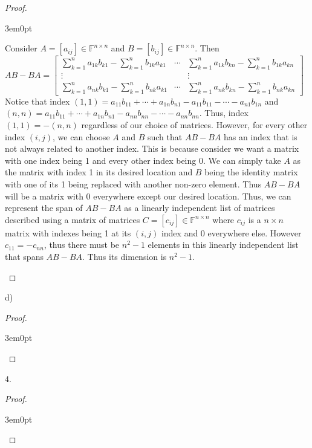 \documentclass[11pt]{article}
\newcommand{\F}{\mathbb{F}}
\newenvironment{myproof}
{\begin{proof} \begin{adjustwidth}{3em}{0pt}$ $\par\nobreak\ignorespaces}
{\end{adjustwidth} \end{proof}}
\begin{document}
\begin{flushleft}
\begin{myproof}
Consider $A = [a_{ij}] \in \F^{n \times n}$ and $B = [b_{ij}] \in \F^{n \times n}$. Then $AB - BA = \begin{bmatrix}
\sum_{k = 1}^n a_{1k}b_{k1} - \sum_{k = 1}^n b_{1k}a_{k1} & \cdots & \sum_{k = 1}^n a_{1k}b_{kn} - \sum_{k = 1}^n b_{1k}a_{kn} \\
\vdots & & \vdots \\
\sum_{k = 1}^n a_{nk}b_{k1} - \sum_{k = 1}^n b_{nk}a_{k1} & \cdots & \sum_{k = 1}^n a_{nk}b_{kn} - \sum_{k = 1}^n b_{nk}a_{kn}
\end{bmatrix}$ \\
\bigskip
Notice that index $(1,1) = a_{11}b_{11} + \cdots + a_{1n}b_{n1} - a_{11}b_{11} - \cdots - a_{n1}b_{1n}$ and $(n,n) =  a_{11}b_{11} + \cdots + a_{1n}b_{n1} - a_{nn}b_{nn} - \cdots - a_{nn}b_{nn}$. Thus, index $(1,1) = -(n,n)$ regardless of our choice of matrices. However, for every other index $(i,j)$, we can choose $A$ and $B$ such that $AB -BA$ has an index that is not always related to another index. This is because consider we want a matrix with one index being 1 and every other index being 0. We can simply take $A$ as the matrix with index 1 in its desired location and $B$ being the identity matrix with one of its 1 being replaced with another non-zero element. Thus $AB-BA$ will be a matrix with 0 everywhere except our desired location. Thus, we can represent the span of $AB-BA$ as a linearly independent list of matrices described using a matrix of matrices $C = [c_{ij}] \in \F^{n \times n}$ where $c_{ij}$ is a $n \times n$ matrix with indexes being 1 at its $(i,j)$ index and 0 everywhere else. However $c_{11} = -c_{nn}$, thus there must be $n^2 -1$ elements in this linearly independent list that spans $AB-BA$. Thus its dimension is $n^2 -1$.

\end{myproof}

d)

\begin{myproof}



\end{myproof}

\newpage

4.

\begin{myproof}


\end{myproof}
\end{flushleft}
\end{document}
